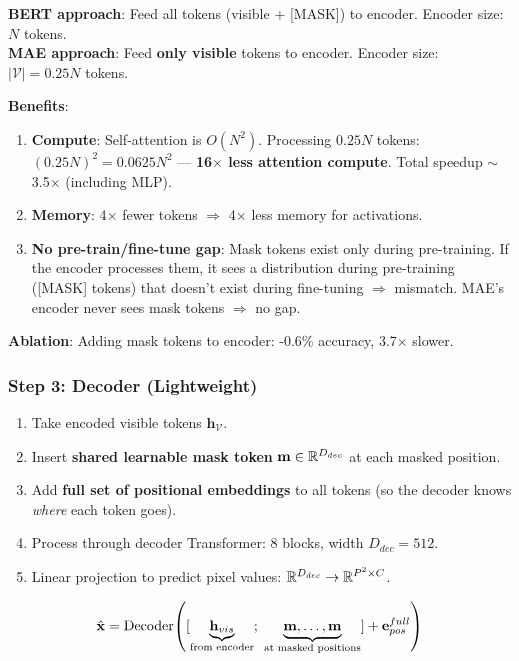 \begin{keybox}
\textbf{BERT approach}: Feed all tokens (visible + [MASK]) to encoder. Encoder size: $N$ tokens.\\
\textbf{MAE approach}: Feed \textbf{only visible} tokens to encoder. Encoder size: $|\mathcal{V}| = 0.25N$ tokens.

\textbf{Benefits}:
\begin{enumerate}
\item \textbf{Compute}: Self-attention is $O(N^2)$. Processing $0.25N$ tokens: $(0.25N)^2 = 0.0625N^2$ — \textbf{16$\times$ less attention compute}. Total speedup $\sim$3.5$\times$ (including MLP).
\item \textbf{Memory}: 4$\times$ fewer tokens $\Rightarrow$ 4$\times$ less memory for activations.
\item \textbf{No pre-train/fine-tune gap}: Mask tokens exist only during pre-training. If the encoder processes them, it sees a distribution during pre-training ([MASK] tokens) that doesn't exist during fine-tuning $\Rightarrow$ mismatch. MAE's encoder never sees mask tokens $\Rightarrow$ no gap.
\end{enumerate}

\textbf{Ablation}: Adding mask tokens to encoder: -0.6\% accuracy, 3.7$\times$ slower.
\end{keybox}

\subsubsection{Step 3: Decoder (Lightweight)}
\begin{enumerate}
\item Take encoded visible tokens $\mathbf{h}_\mathcal{V}$.
\item Insert \textbf{shared learnable mask token} $\mathbf{m} \in \mathbb{R}^{D_{dec}}$ at each masked position.
\item Add \textbf{full set of positional embeddings} to all tokens (so the decoder knows \textit{where} each token goes).
\item Process through decoder Transformer: 8 blocks, width $D_{dec} = 512$.
\item Linear projection to predict pixel values: $\mathbb{R}^{D_{dec}} \to \mathbb{R}^{P^2 \times C}$.
\end{enumerate}

$$\hat{\mathbf{x}} = \text{Decoder}\!\left([\underbrace{\mathbf{h}_{vis}}_{\text{from encoder}};\; \underbrace{\mathbf{m}, \ldots, \mathbf{m}}_{\text{at masked positions}}] + \mathbf{e}_{pos}^{full}\right)$$

